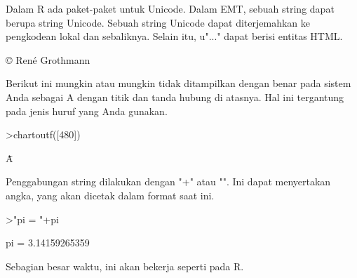 \documentclass[12pt,arial,letterpaper]{book}
\begin{document}
\begin{eulernootebook}
\begin{eulercomment}
\begin{eulercomment}
\begin{eulernootebook}
\begin{eulercomment}
\begin{eulercomment}
\begin{eulercomment}
\begin{eulercomment}
\begin{eulercomment}
\begin{eulercomment}
\begin{eulercomment}
\begin{eulercomment}
\begin{eulercomment}
\begin{eulercomment}
\begin{eulercomment}
\begin{eulercomment}
Dalam R ada paket-paket untuk Unicode. Dalam EMT, sebuah string dapat
berupa string Unicode. Sebuah string Unicode dapat diterjemahkan ke
pengkodean lokal dan sebaliknya. Selain itu, u"..." dapat berisi
entitas HTML.
\end{eulercomment}
\begin{euleroutput}
  © René Grothmann
\end{euleroutput}
\begin{eulercomment}
Berikut ini mungkin atau mungkin tidak ditampilkan dengan benar pada
sistem Anda sebagai A dengan titik dan tanda hubung di atasnya. Hal
ini tergantung pada jenis huruf yang Anda gunakan.
\end{eulercomment}
\begin{eulerprompt}
>chartoutf([480])
\end{eulerprompt}
\begin{euleroutput}
  Ǡ
\end{euleroutput}
\begin{eulercomment}
Penggabungan string dilakukan dengan "+" atau "\textbar{}". Ini dapat
menyertakan angka, yang akan dicetak dalam format saat ini.
\end{eulercomment}
\begin{eulerprompt}
>"pi = "+pi
\end{eulerprompt}
\begin{euleroutput}
  pi = 3.14159265359
\end{euleroutput}
\begin{eulercomment}
Sebagian besar waktu, ini akan bekerja seperti pada R.


\end{eulercomment}
\end{eulercomment}
\end{eulercomment}
\end{eulercomment}
\end{eulercomment}
\end{eulercomment}
\end{eulercomment}
\end{eulercomment}
\end{eulercomment}
\end{eulercomment}
\end{eulercomment}
\end{eulercomment}
\end{eulernootebook}
\end{eulercomment}
\end{eulercomment}
\end{eulernootebook}
\end{document}
